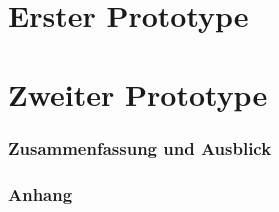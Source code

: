 \documentclass[a4paper,11pt]{article}
\begin{document}



\newpage
\renewcommand{\contentsname}{Inhaltsverzeichnis}
\tableofcontents
\clearpage





\newpage
\part{Erster Prototype}



\newpage
\part{Zweiter Prototype}




\newpage
\section{Zusammenfassung und Ausblick} \label{ende-sec}



\newpage 
\renewcommand{\listfigurename}{Abbildungsverzeichnis}
\listoffigures


\newpage
\renewcommand{\listtablename}{Tabellenverzeichnis}
\listoftables


\newpage



\newpage
\section*{Anhang}


\newpage


\end{document}
